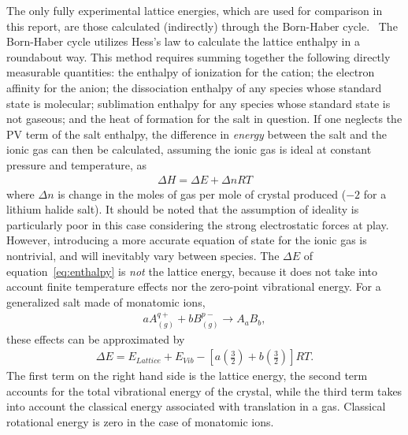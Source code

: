 \documentclass[titlepage,11pt]{article}
\begin{document}
The only fully experimental lattice energies, which are used for comparison in this report, are those calculated (indirectly) through the Born-Haber cycle.~\cite{book:CRC,Jenkins2005} The Born-Haber cycle utilizes Hess's law to calculate the lattice enthalpy in a roundabout way. This method requires summing together the following directly measurable quantities: the enthalpy of ionization for the cation; the electron affinity for the anion; the dissociation enthalpy of any species whose standard state is molecular; sublimation enthalpy for any species whose standard state is not gaseous; and the heat of formation for the salt in question. If one neglects the PV term of the salt enthalpy, the difference in \textit{energy} between the salt and the ionic gas can then be calculated, assuming the ionic gas is ideal at constant pressure and temperature, as
\begin{align}
\Delta H =  \Delta E + \Delta n R T
\label{eq:enthalpy}
\end{align}
where $\Delta n$ is change in the moles of gas per mole of crystal produced ($-2$ for a lithium halide salt). It should be noted that the assumption of ideality is particularly poor in this case considering the strong electrostatic forces at play. However, introducing a more accurate equation of state for the ionic gas is nontrivial, and will inevitably vary between species. The $\Delta E$ of equation~\ref{eq:enthalpy} is \textit{not} the lattice energy, because it does not take into account finite temperature effects nor the zero-point vibrational energy. For a generalized salt made of monatomic ions,
\begin{align}
a A^{q+}_{(g)} + b B^{p-}_{(g)} \rightarrow A_{a}B_{b},
\end{align}
these effects can be approximated by~\cite{Jenkins2005}
\begin{align}
\Delta E = E _ { Lattice } + E _ { Vib } - \left[ a \left( \frac { 3 }{ 2 } \right) + b \left( \frac{ 3 } { 2 } \right) \right] R T .
\label{eq:energyeffects}
\end{align}
The first term on the right hand side is the lattice energy, the second term accounts for the total vibrational energy of the crystal, while the third term takes into account the classical energy associated with translation in a gas. Classical rotational energy is zero in the case of monatomic ions. 
\end{document}
